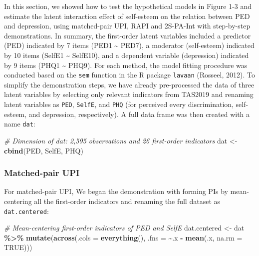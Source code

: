 \documentclass[
  man]{apa7}
\newenvironment{Shaded}{\begin{snugshade}}{\end{snugshade}}
\newcommand{\AttributeTok}[1]{\textcolor[rgb]{0.13,0.29,0.53}{#1}}
\newcommand{\CommentTok}[1]{\textcolor[rgb]{0.56,0.35,0.01}{\textit{#1}}}
\newcommand{\ConstantTok}[1]{\textcolor[rgb]{0.56,0.35,0.01}{#1}}
\newcommand{\FunctionTok}[1]{\textcolor[rgb]{0.13,0.29,0.53}{\textbf{#1}}}
\newcommand{\NormalTok}[1]{#1}
\newcommand{\OtherTok}[1]{\textcolor[rgb]{0.56,0.35,0.01}{#1}}
\newcommand{\SpecialCharTok}[1]{\textcolor[rgb]{0.81,0.36,0.00}{\textbf{#1}}}
\begin{document}
In this section, we showed how to test the hypothetical models in Figure 1-3 and estimate the latent interaction effect of self-esteem on the relation between PED and depression, using matched-pair UPI, RAPI and 2S-PA-Int with step-by-step demonstrations. In summary, the first-order latent variables included a predictor (PED) indicated by 7 items (PED1 \textasciitilde{} PED7), a moderator (self-esteem) indicated by 10 items (SelfE1 \textasciitilde{} SelfE10), and a dependent variable (depression) indicated by 9 items (PHQ1 \textasciitilde{} PHQ9). For each method, the model fitting procedure was conducted based on the \texttt{sem} function in the R package \texttt{lavaan} (Rosseel, 2012). To simplify the demonstration steps, we have already pre-processed the data of three latent variables by selecting only relevant indicators from TAS2019 and renaming latent variables as \texttt{PED}, \texttt{SelfE}, and \texttt{PHQ} (for perceived every discrimination, self-esteem, and depression, respectively). A full data frame was then created with a name \texttt{dat}:

\begin{Shaded}
\begin{Highlighting}[]
\CommentTok{\# Dimension of dat: 2,595 observations and 26 first{-}order indicators}
\NormalTok{dat }\OtherTok{\textless{}{-}} \FunctionTok{cbind}\NormalTok{(PED, SelfE, PHQ)}
\end{Highlighting}
\end{Shaded}

\hypertarget{matched-pair-upi}{%
\subsubsection{Matched-pair UPI}\label{matched-pair-upi}}

For matched-pair UPI, We began the demonstration with forming PIs by mean-centering all the first-order indicators and renaming the full dataset as \texttt{dat.centered}:

\begin{Shaded}
\begin{Highlighting}[]
\CommentTok{\# Mean{-}centering first{-}order indicators of PED and SelfE}
\NormalTok{dat.centered }\OtherTok{\textless{}{-}}\NormalTok{ dat }\SpecialCharTok{\%\textgreater{}\%}
    \FunctionTok{mutate}\NormalTok{(}\FunctionTok{across}\NormalTok{(}\AttributeTok{.cols =} \FunctionTok{everything}\NormalTok{(), }\AttributeTok{.fns =} \SpecialCharTok{\textasciitilde{}}\NormalTok{.x }\SpecialCharTok{{-}} \FunctionTok{mean}\NormalTok{(.x, }\AttributeTok{na.rm =} \ConstantTok{TRUE}\NormalTok{)))}
\end{Highlighting}
\end{Shaded}
\end{document}
